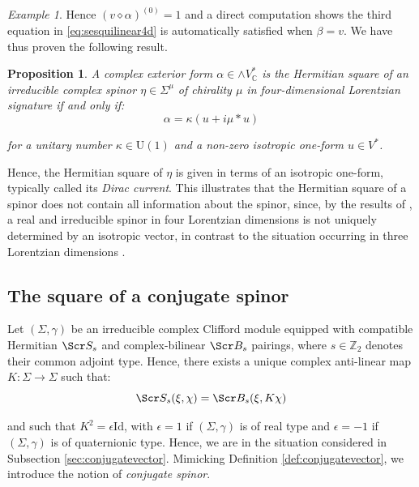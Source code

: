 \documentclass[10pt,a4paper,twoside,reqno]{amsart}
\theoremstyle{plain}
\newtheorem{prop}[thm]{Proposition}
\theoremstyle{definition}
\theoremstyle{remark}
\newtheorem{example}[thm]{Example}
\def\Id{\mathrm{Id}}
\def\scB{\Scr B}
\def\scS{\Scr S}
\def\U{\mathrm{U}}
\begin{document}
\begin{example}
\noindent
Hence $(v\diamond \alpha)^{(0)} = 1$ and a direct computation shows the third equation in \eqref{eq:sesquilinear4d} is automatically satisfied when $\beta = v$. We have thus proven the following result. 

\begin{prop}
A complex exterior form $\alpha\in \wedge V^{\ast}_{\mathbb{C}}$ is the Hermitian square of an irreducible complex spinor $\eta \in \Sigma^{\mu}$ of chirality $\mu$ in four-dimensional Lorentzian signature if and only if:
\begin{equation*}
\alpha = \kappa (u + i \mu \ast u)
\end{equation*}

\noindent
for a unitary number $\kappa \in \U(1)$ and a non-zero isotropic one-form $u\in V^{\ast}$.
\end{prop}

\noindent
Hence, the Hermitian square of $\eta$ is given in terms of an isotropic one-form, typically called its \emph{Dirac current}. This illustrates that the Hermitian square of a spinor does not contain all information about the spinor, since, by the results of \cite{CLS21}, a real and irreducible spinor in four Lorentzian dimensions is not uniquely determined by an isotropic vector, in contrast to the situation occurring in three Lorentzian dimensions \cite{Sha24}.
\end{example}


\subsection{The square of a conjugate spinor}
\label{subsec:conjugateeven}


Let $(\Sigma,\gamma)$ be an irreducible complex Clifford module equipped with compatible Hermitian $\scS_s$ and complex-bilinear $\scB_s$ pairings, where $s\in \mathbb{Z}_2$ denotes their common adjoint type. Hence, there exists a unique complex anti-linear map $K\colon \Sigma \to \Sigma$ such that:
\begin{equation*}
\scS_s( \xi , \chi) = \scB_s ( \xi , K \chi)
\end{equation*}

\noindent
and such that $K^2 = \epsilon \Id$, with $\epsilon = 1$ if $(\Sigma,\gamma)$ is of real type and $\epsilon = -1$ if $(\Sigma,\gamma)$ is of quaternionic type. Hence, we are in the situation considered in Subsection \ref{sec:conjugatevector}. Mimicking Definition \ref{def:conjugatevector}, we introduce the notion of \emph{conjugate spinor}.
\end{document}
